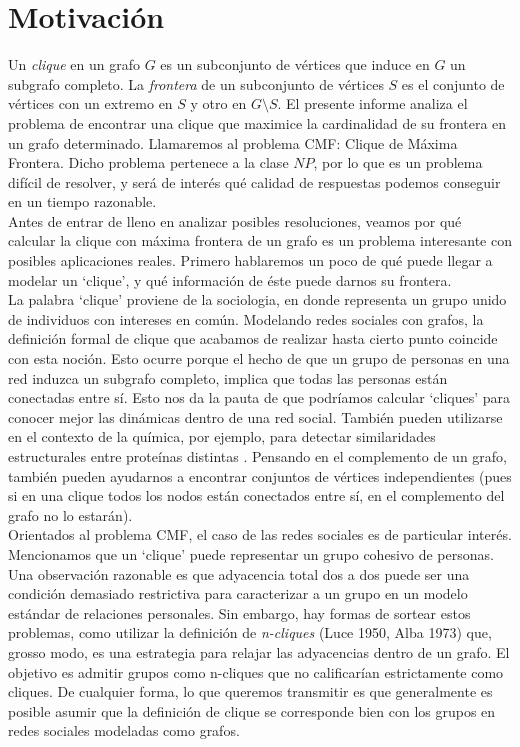 
\section{Motivación}

Un \textit{clique} en un grafo $G$ es un subconjunto de vértices que induce en $G$ un subgrafo completo. La \textit{frontera} de un subconjunto de vértices $S$ es el conjunto de vértices con un extremo en $S$ y otro en $G \setminus S$. El presente informe analiza el problema de encontrar una clique que maximice la cardinalidad de su frontera en un grafo determinado. Llamaremos al problema CMF: Clique de Máxima Frontera. Dicho problema pertenece a la clase $NP$, por lo que es un problema difícil de resolver, y será de interés qué calidad de respuestas podemos conseguir en un tiempo razonable. \\

Antes de entrar de lleno en analizar posibles resoluciones, veamos por qué calcular la clique con máxima frontera de un grafo es un problema interesante con posibles aplicaciones reales. Primero hablaremos un poco de qué puede llegar a modelar un `clique', y qué información de éste puede darnos su frontera. \\

La palabra `clique' proviene de la sociologia, en donde representa un grupo unido de individuos con intereses en común. Modelando redes sociales con grafos, la definición formal de clique que acabamos de realizar hasta cierto punto coincide con esta noción. Esto ocurre porque el hecho de que un grupo de personas en una red induzca un subgrafo completo, implica que todas las personas están conectadas entre sí. Esto nos da la pauta de que podríamos calcular `cliques' para conocer mejor las dinámicas dentro de una red social. También pueden utilizarse en el contexto de la química, por ejemplo, para detectar similaridades estructurales entre proteínas distintas \cite{proteins}. Pensando en el complemento de un grafo, también pueden ayudarnos a encontrar conjuntos de vértices independientes (pues si en una clique todos los nodos están conectados entre sí, en el complemento del grafo no lo estarán). \\

Orientados al problema CMF, el caso de las redes sociales es de particular interés. Mencionamos que un `clique' puede representar un grupo cohesivo de personas. Una observación razonable es que adyacencia total dos a dos puede ser una condición demasiado restrictiva para caracterizar a un grupo en un modelo estándar de relaciones personales. Sin embargo, hay formas de sortear estos problemas, como utilizar la definición de \textit{n-cliques} (Luce 1950, Alba 1973) que, grosso modo, es una estrategia para relajar las adyacencias dentro de un grafo. El objetivo es admitir grupos como n-cliques que no calificarían estrictamente como cliques. De cualquier forma, lo que queremos transmitir es que generalmente es posible asumir que la definición de clique se corresponde bien con los grupos en redes sociales modeladas como grafos. \\

